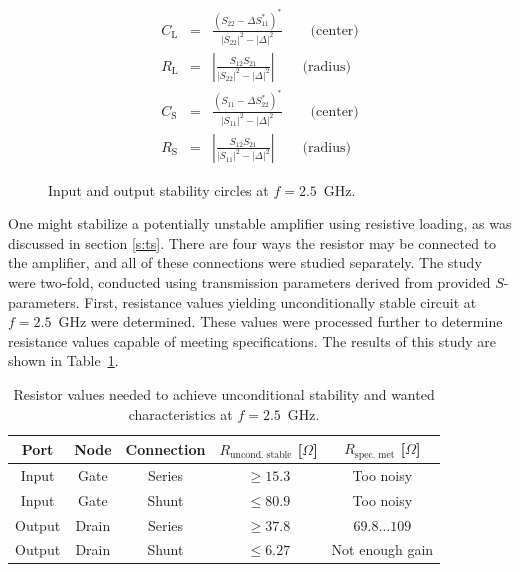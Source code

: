 \documentclass[a4paper, 12pt]{article}
\newlength{\oneLine}
\newcommand{\m}[1]{\mathrm{#1}}
\begin{document}
\begin{eqnarray}
C_\m{L} &=& \frac{ (S_{22} - \Delta S_{11}^*)^* }{ |S_{22}|^2 - |\Delta|^2 } \qquad \textrm{(center)} \label{e:CL} \\
R_\m{L} &=& \left| \frac{ S_{12} S_{21} }{ |S_{22}|^2 -|\Delta|^2 } \right| \qquad \textrm{(radius)} \label{e:RL} \\
C_\m{S} &=& \frac{ (S_{11} - \Delta S_{22}^*)^* }{ |S_{11}|^2 - |\Delta|^2 } \qquad \textrm{(center)} \label{e:CS} \\
R_\m{S} &=& \left| \frac{ S_{12} S_{21} }{ |S_{11}|^2 -|\Delta|^2 } \right| \qquad \textrm{(radius)} \label{e:RS}
\end{eqnarray}

\begin{figure}[!h]
	\begin{center}
		\caption{Input and output stability circles at $f = 2.5$~GHz.}
		\label{f:SLstab}
	\end{center}
\end{figure}

One might stabilize a potentially unstable amplifier using resistive loading, as was discussed 
in section \ref{s:ts}. There are four ways the resistor may be connected to the amplifier, and 
all of these connections were studied separately. The study were two-fold, conducted using 
transmission parameters derived from provided $S$-parameters. First, resistance values yielding 
unconditionally stable circuit at $f = 2.5$~GHz were determined. These values were processed 
further to determine resistance values capable of meeting specifications. The results of this 
study are shown in Table~\ref{t:s}.

\begin{table}[!h]
	\begin{center}
		\caption{Resistor values needed to achieve unconditional stability and wanted characteristics at $f = 2.5$~GHz.}
		\label{t:s}
		\renewcommand{\arraystretch}{1.2}
		\begin{tabular}{ccccc}
			Port	& Node		& Connection	& $R_\mathrm{uncond.\;stable}$ [$\Omega$]	& $R_\mathrm{spec.\;met}$ [$\Omega$] \\
			\hline
			Input 	& Gate		& Series		& $\geq 15.3$								& Too noisy				\\
			Input 	& Gate		& Shunt			& $\leq 80.9$								& Too noisy				\\
			Output 	& Drain		& Series		& $\geq 37.8$								& $69.8 \ldots 109$ 	\\
			Output  & Drain		& Shunt			& $\leq 6.27$								& Not enough gain		\\
		\end{tabular}
	\end{center}
	\vspace{-\oneLine}
\end{table}
\end{document}
